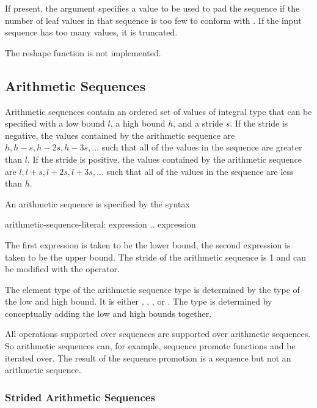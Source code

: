 If present, the  argument specifies a value to be used to
pad the sequence if the number of leaf values in that sequence is too
few to conform with . If the input sequence has too many
values, it is truncated.

\begin{status}
The reshape function is not implemented.
\end{status}

\subsection{Arithmetic Sequences}
\label{Arithmetic_Sequences}
Arithmetic sequences contain an ordered set of values of integral type
that can be specified with a low bound $l$, a high bound $h$, and a
stride $s$.  If the stride is negative, the values contained by the
arithmetic sequence are $h, h-s, h-2s, h-3s, ...$ such that all of the
values in the sequence are greater than $l$.  If the stride is
positive, the values contained by the arithmetic sequence are $l, l+s,
l+2s, l+3s, ...$ such that all of the values in the sequence are
less than $h$.

An arithmetic sequence is specified by the syntax
\begin{syntax}
arithmetic-sequence-literal:
  expression .. expression
\end{syntax}
The first expression is taken to be the lower bound, the second
expression is taken to be the upper bound.  The stride of the
arithmetic sequence is 1 and can be modified with the 
operator.

The element type of the arithmetic sequence type is determined by the
type of the low and high bound.  It is
either , , , or .  The
type is determined by conceptually adding the low and high bounds
together.

All operations supported over sequences are supported over arithmetic
sequences.  So arithmetic sequences can, for example, sequence promote
functions and be iterated over.  The result of the sequence promotion
is a sequence but not an arithmetic sequence.

\subsubsection{Strided Arithmetic Sequences}
\label{Strided_Arithmetic_Sequences}

